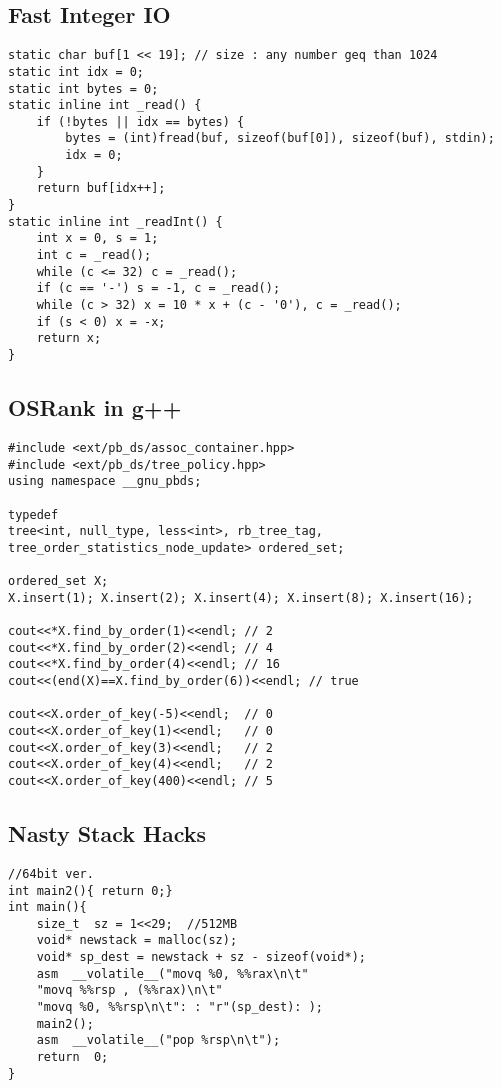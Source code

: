 \documentclass[landscape, 10pt, a4paper, oneside,  twocolumn]{article}
\begin{document}
\subsection {Fast Integer IO}
\begin{verbatim}
static char buf[1 << 19]; // size : any number geq than 1024 
static int idx = 0;
static int bytes = 0;
static inline int _read() {
    if (!bytes || idx == bytes) {
        bytes = (int)fread(buf, sizeof(buf[0]), sizeof(buf), stdin);
        idx = 0;
    }
    return buf[idx++];
}
static inline int _readInt() {
    int x = 0, s = 1;
    int c = _read();
    while (c <= 32) c = _read();
    if (c == '-') s = -1, c = _read();
    while (c > 32) x = 10 * x + (c - '0'), c = _read();
    if (s < 0) x = -x;
    return x;
}
\end{verbatim}
\subsection {OSRank in g++}
\begin{verbatim}
#include <ext/pb_ds/assoc_container.hpp> 
#include <ext/pb_ds/tree_policy.hpp> 
using namespace __gnu_pbds; 

typedef
tree<int, null_type, less<int>, rb_tree_tag, tree_order_statistics_node_update> ordered_set;

ordered_set X;
X.insert(1); X.insert(2); X.insert(4); X.insert(8); X.insert(16);

cout<<*X.find_by_order(1)<<endl; // 2
cout<<*X.find_by_order(2)<<endl; // 4
cout<<*X.find_by_order(4)<<endl; // 16
cout<<(end(X)==X.find_by_order(6))<<endl; // true

cout<<X.order_of_key(-5)<<endl;  // 0
cout<<X.order_of_key(1)<<endl;   // 0
cout<<X.order_of_key(3)<<endl;   // 2
cout<<X.order_of_key(4)<<endl;   // 2
cout<<X.order_of_key(400)<<endl; // 5
\end{verbatim}

\subsection {Nasty Stack Hacks}
\begin{verbatim}
//64bit ver.
int main2(){ return 0;}
int main(){
	size_t  sz = 1<<29;  //512MB
	void* newstack = malloc(sz);
	void* sp_dest = newstack + sz - sizeof(void*);
	asm  __volatile__("movq %0, %%rax\n\t"
	"movq %%rsp , (%%rax)\n\t"
	"movq %0, %%rsp\n\t": : "r"(sp_dest): );
	main2();
	asm  __volatile__("pop %rsp\n\t");
	return  0;
}
\end{verbatim}
\end{document}
